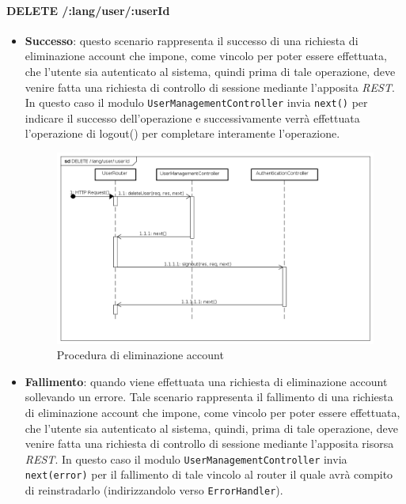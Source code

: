 
\paragraph{DELETE /:lang/user/:userId}
\begin{itemize}
\item \textbf{Successo}: questo scenario rappresenta il successo di una richiesta di eliminazione account che impone, come vincolo per poter essere effettuata, che l'utente sia autenticato al sistema, quindi prima di tale operazione, deve venire fatta una richiesta di controllo di sessione mediante l'apposita \textit{REST}.
In questo caso il modulo \texttt{UserManagementController} invia \texttt{next()} per indicare il successo dell'operazione e successivamente verrà effettuata l'operazione di logout() per completare interamente l'operazione.
\label{Procedura di eliminazione account}
\begin{figure}[ht]
	\centering
	\includegraphics[scale=0.40]{UML/DiagrammiDiSequenza/Back-end/DELETE_LangUserUseridSuccess.png}
	\caption{Procedura di eliminazione account}
\end{figure}
\FloatBarrier

\item \textbf{Fallimento}: quando viene effettuata una richiesta di eliminazione account sollevando un errore. Tale scenario rappresenta il fallimento di una richiesta di eliminazione account che impone, come vincolo per poter essere effettuata, che l'utente sia autenticato al sistema, quindi, prima di tale operazione, deve venire fatta una richiesta di controllo di sessione mediante l'apposita risorsa \textit{REST}. In questo caso il modulo \texttt{UserManagementController} invia \texttt{next(error)} per il fallimento di tale vincolo al router il quale avrà compito di reinstradarlo (indirizzandolo verso \texttt{ErrorHandler}).


\end{itemize}
